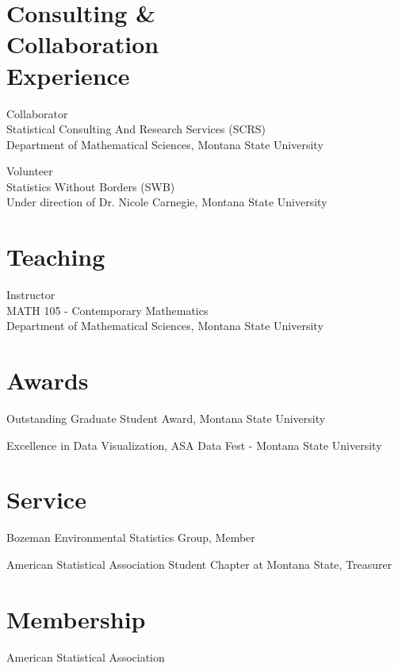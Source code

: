 \documentclass{wm_cv}
\begin{document}
\section{Consulting \& \\ Collaboration \\ Experience}

Collaborator \hfill {} \\ 
    \indent \quad Statistical Consulting And Research Services (SCRS) \\
   \indent \quad Department of Mathematical Sciences, Montana State University

Volunteer \hfill {} \\ 
    \indent \quad Statistics Without Borders (SWB) \\
   \indent \quad Under direction of Dr. Nicole Carnegie, Montana State University


\section{Teaching}


Instructor \hfill {} \\ 
    \indent \quad MATH 105 - Contemporary Mathematics  \\
   \indent \quad Department of Mathematical Sciences, Montana State University

\section{Awards}

Outstanding Graduate Student Award, Montana State University \hfill {}  

Excellence in Data Visualization, ASA Data Fest - Montana State University \hfill  {}



\section{Service}

Bozeman Environmental Statistics Group, Member \hfill  {}

American Statistical Association Student Chapter at Montana State, Treasurer \hfill  {}

\section{Membership}

American Statistical Association \\
\end{document}
